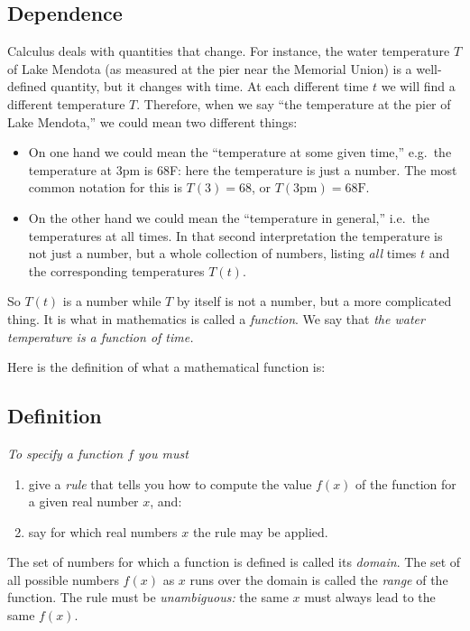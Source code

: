 \subsection{Dependence} 
Calculus deals with quantities that change.  For
instance, the water temperature $T$ of Lake Mendota (as measured at
the pier near the Memorial Union) is a well-defined quantity, but it
changes with time.  At each different time $t$ we will find a
different temperature $T$.  Therefore, when we say ``the temperature at
the pier of Lake Mendota,'' we could mean two different things:   


\begin{itemize}
\item On one hand we could mean the ``temperature at some given
  time,'' e.g.~the temperature at 3pm is 68F: here the temperature is
  just a number.  The most common notation for this is $T(3) = 68$, or
  $T(3\textrm{pm}) = 68\textrm{F}$.

\item On the other hand we could mean the ``temperature in general,''
  i.e.~the temperatures at all times.  In that second interpretation
  the temperature is not just a number, but a whole collection of
  numbers, listing \emph{all} times $t$ and the corresponding
  temperatures $T(t)$.
\end{itemize}


So $T(t)$ is a number while $T$ by itself is not a number, but a more
complicated thing.  It is what in mathematics is called a
\emph{function}.  We say that \textit{the water temperature is a
  function of time.}

Here is the definition of what a mathematical function is:

\subsection{Definition} 
\itshape
To specify a \emph{function} $f$ you must
\begin{enumerate}
\item give a \emph{rule} that tells you how to compute the value $f(x)$ of
  the function for a given real number $x$, and:
\item say for which real numbers $x$ the rule may be applied.
\end{enumerate}%
The set of numbers for which a function is defined is called its \emph{domain}.
The set of all possible numbers $f(x)$ as $x$ runs over the domain is called the
\emph{range} of the function.  The rule must be \emph{unambiguous:} the same
$x$ must always lead to the same $f(x)$.
\upshape

